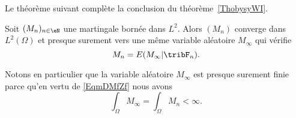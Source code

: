 Le théorème suivant complète la conclusion du théorème~\ref{ThobysyWI}.
\begin{theorem} \label{ThofcttYW}
    Soit \( (M_n)_{n\in \eN}\) une martingale bornée dans \( L^2\). Alors \( (M_n)\) converge dans \( L^2(\Omega)\) et presque surement vers une même variable aléatoire \( M_{\infty}\) qui vérifie
    \begin{equation}        \label{EqmDMfZf}
        M_n=E(M_{\infty}|\tribF_n).
    \end{equation}
\end{theorem}

Notons en particulier que la variable aléatoire \( M_{\infty}\) est presque surement finie parce qu'en vertu de \eqref{EqmDMfZf} nous avons
\begin{equation}
    \int_{\Omega}M_{\infty}=\int_{\Omega}M_n<\infty.
\end{equation}

